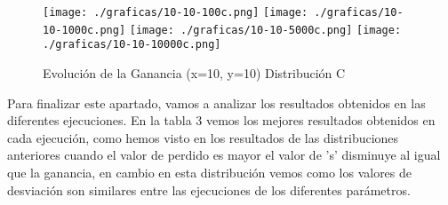 \documentclass{article}
\begin{document}
	
	\begin{figure}[h]
		\centering
		\texttt{[image: ./graficas/10-10-100c.png]}
		\texttt{[image: ./graficas/10-10-1000c.png]}
		\texttt{[image: ./graficas/10-10-5000c.png]}
		\texttt{[image: ./graficas/10-10-10000c.png]}
		\caption{Evolución de la Ganancia (x=10, y=10) Distribución C}
	\end{figure} 

	Para finalizar este apartado, vamos a analizar los resultados obtenidos en las diferentes ejecuciones. En la tabla 3 vemos los mejores resultados obtenidos en cada ejecución, como hemos visto en los resultados de las distribuciones anteriores cuando el valor de perdido es mayor el valor de 's' disminuye al igual que la ganancia, en cambio en esta distribución vemos como los valores de desviación son similares entre las ejecuciones de los diferentes parámetros.
\end{document}
